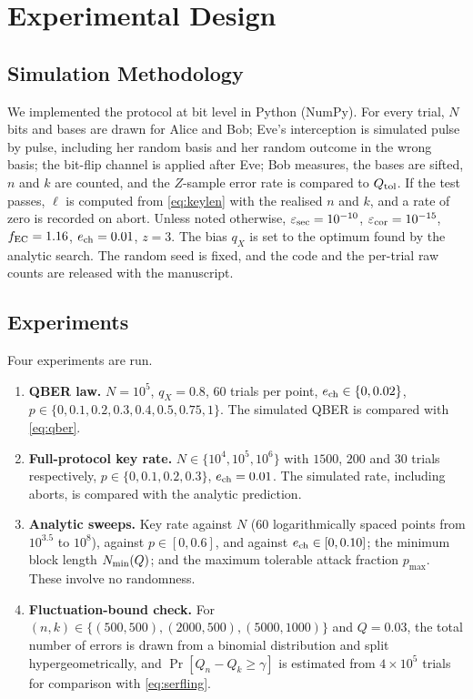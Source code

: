 \section{Experimental Design}\label{sec:design}

\subsection{Simulation Methodology}
We implemented the protocol at bit level in Python (NumPy). For every trial, $N$ bits and bases are drawn for Alice and Bob; Eve's interception is simulated pulse by pulse, including her random basis and her random outcome in the wrong basis; the bit-flip channel is applied after Eve; Bob measures, the bases are sifted, $n$ and $k$ are counted, and the $Z$-sample error rate is compared to $Q_{\mathrm{tol}}$. If the test passes, $\ell$ is computed from \eqref{eq:keylen} with the realised $n$ and $k$, and a rate of zero is recorded on abort. Unless noted otherwise, $\varepsilon_{\mathrm{sec}}=10^{-10}$, $\varepsilon_{\mathrm{cor}}=10^{-15}$, $f_{\mathrm{EC}}=1.16$, $e_{\mathrm{ch}}=0.01$, $z=3$. The bias $q_X$ is set to the optimum found by the analytic search. The random seed is fixed, and the code and the per-trial raw counts are released with the manuscript.

\subsection{Experiments}
Four experiments are run.
\begin{enumerate}
\item \textbf{QBER law.} $N=10^5$, $q_X=0.8$, $60$ trials per point, $e_{\mathrm{ch}}\in\{0,0.02\}$, $p\in\{0,0.1,0.2,0.3,0.4,0.5,0.75,1\}$. The simulated QBER is compared with \eqref{eq:qber}.
\item \textbf{Full-protocol key rate.} $N\in\{10^4,10^5,10^6\}$ with $1500$, $200$ and $30$ trials respectively, $p\in\{0,0.1,0.2,0.3\}$, $e_{\mathrm{ch}}=0.01$. The simulated rate, including aborts, is compared with the analytic prediction.
\item \textbf{Analytic sweeps.} Key rate against $N$ ($60$ logarithmically spaced points from $10^{3.5}$ to $10^8$), against $p\in[0,0.6]$, and against $e_{\mathrm{ch}}\in[0,0.10]$; the minimum block length $N_{\min}(Q)$; and the maximum tolerable attack fraction $p_{\max}$. These involve no randomness.
\item \textbf{Fluctuation-bound check.} For $(n,k)\in\{(500,500),(2000,500),(5000,1000)\}$ and $Q=0.03$, the total number of errors is drawn from a binomial distribution and split hypergeometrically, and $\Pr[Q_n-Q_k\ge\gamma]$ is estimated from $4\times10^5$ trials for comparison with \eqref{eq:serfling}.
\end{enumerate}

